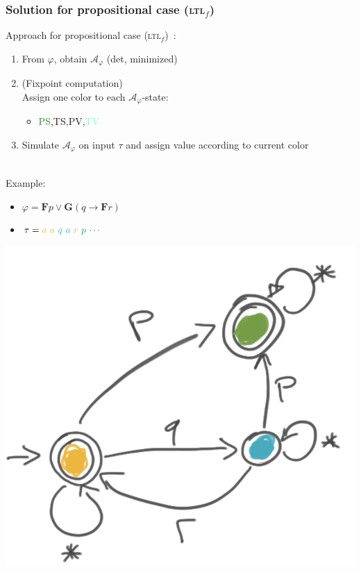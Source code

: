 \documentclass[xcolor=dvipsnames]{beamer}
\newcommand{\A}{\mathcal A\xspace}
\newcommand{\always}{\mathbf{G}\xspace}
\newcommand{\eventually}{\mathbf{F}\xspace}
\newcommand{\ltlf}{\textsc{ltl}$_f$\xspace}
\newcommand{\yellow}[1]{\textcolor{Dandelion}{#1}}
\newcommand{\blue}[1]{\textcolor{Aquamarine}{#1}}
\newcommand{\green}[1]{\textcolor{ForestGreen}{#1}}
\newcommand{\red}[1]{\textcolor{BrickRed}{#1}}
\begin{document}
\begin{frame}
\frametitle{Solution for propositional case (\ltlf)}

Approach for propositional case (\ltlf)~\cite{}:  
\begin{enumerate}
	\item From $\varphi$, obtain $\A_\varphi$ (det, minimized)
	\item (Fixpoint computation)\\ 
		Assign one color to each $\A_\varphi$-state:
	\begin{itemize}
		\item \green{PS},\yellow{TS},\red{PV},\blue{TV}
	\end{itemize}
	\item Simulate $\A_\varphi$ on input $\tau$ and assign value according to current color
\end{enumerate}

~\\

Example:
\begin{itemize}
	\item $\varphi=\eventually p\lor \always(q\rightarrow\eventually r)$
	\item $\tau=\yellow{a}~\yellow{a}~\blue{q}~\blue{a}~\yellow{r}~\green{p}~\green{\cdots}$
\end{itemize}

\begin{center}
	\includegraphics[scale=.2]{figures/a_phi_colored}
\end{center}
\end{frame}
\end{document}
